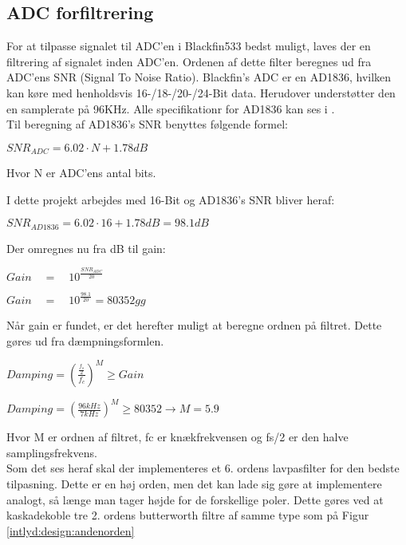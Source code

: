 
\subsection*{ADC forfiltrering}

For at tilpasse signalet til ADC'en i Blackfin533 bedst muligt, laves der en filtrering af signalet inden ADC'en. 
Ordenen af dette filter beregnes ud fra ADC'ens SNR (Signal To Noise Ratio). Blackfin's ADC er en AD1836, hvilken kan køre med henholdsvis 16-/18-/20-/24-Bit data. Herudover understøtter den en samplerate på 96KHz. Alle specifikationr for AD1836 kan ses i 
\citep{AD1836}. \\

Til beregning af AD1836's SNR benyttes følgende formel:
\begin{center}
${ SNR }_{ ADC }=6.02\cdot N+1.78dB$
\end{center}

Hvor N er ADC'ens antal bits. 

I dette projekt arbejdes med 16-Bit og AD1836's SNR bliver heraf: 
\begin{center}
${ SNR }_{ AD1836 }=6.02\cdot 16+1.78dB = 98.1dB$
\end{center}

Der omregnes nu fra dB til gain: 
\begin{center}
$Gain\quad =\quad { 10 }^{ \frac { { SNR }_{ ADC } }{ 20 }  }$

$Gain\quad =\quad { 10 }^{ \frac { 98.1 }{ 20 }  }=80352gg$
\end{center}

Når gain er fundet, er det herefter muligt at beregne ordnen på filtret. Dette gøres ud fra dæmpningsformlen. 
\begin{center}
$Damping={ \left( \frac { \frac { { f }_{ s } }{ 2 }  }{ { f }_{ c } }  \right)  }^{ M }\ge Gain$

$Damping={ \left( \frac { 96kHz }{ 7kHz }  \right)  }^{ M }\ge 80352\rightarrow M=5.9$
\end{center}

Hvor M er ordnen af filtret, fc er knækfrekvensen og fs/2 er den halve samplingsfrekvens.\\

Som det ses heraf skal der implementeres et 6. ordens lavpasfilter for den bedste tilpasning. Dette er en høj orden, men det kan lade sig gøre at implementere analogt, så længe man tager højde for de forskellige poler. 
Dette gøres ved at kaskadekoble tre 2. ordens butterworth filtre af samme type som på Figur \ref{intlyd:design:andenorden}

